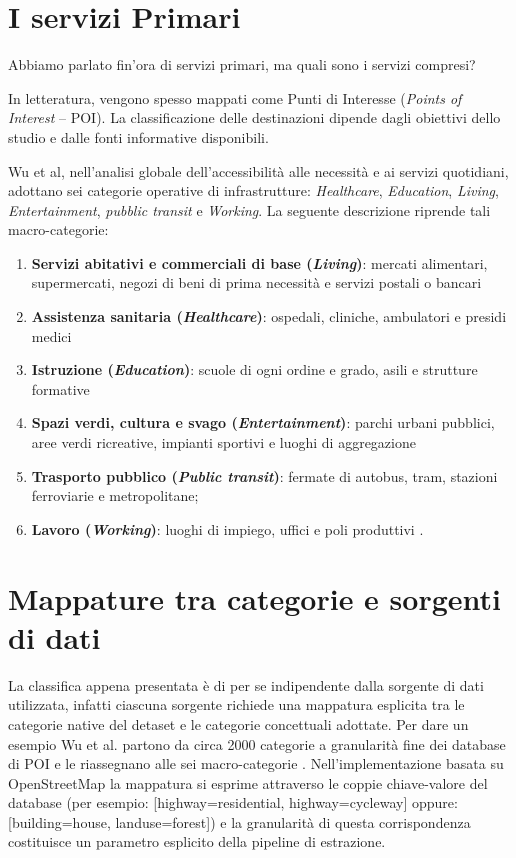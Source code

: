\section{I servizi Primari}
Abbiamo parlato fin'ora di servizi primari, ma quali sono i servizi compresi?

In letteratura, vengono spesso mappati come Punti di Interesse (\textit{Points of Interest} -- POI). La classificazione delle destinazioni dipende dagli obiettivi dello studio e dalle fonti informative disponibili.

Wu et al, nell'analisi globale dell'accessibilità alle necessità e ai servizi quotidiani, adottano sei categorie operative di infrastrutture: \emph{Healthcare}, \emph{Education}, \emph{Living}, \emph{Entertainment}, \emph{pubblic transit} e \emph{Working}. La seguente descrizione riprende tali macro-categorie: \cite{wu2025}
\begin{enumerate}
    \item \textbf{Servizi abitativi e commerciali di base (\textit{Living})}: mercati alimentari, supermercati, negozi di beni di prima necessità e servizi postali o bancari 
    \item \textbf{Assistenza sanitaria (\textit{Healthcare})}: ospedali, cliniche, ambulatori e presidi medici 
    \item \textbf{Istruzione (\textit{Education})}: scuole di ogni ordine e grado, asili e strutture formative 
    \item \textbf{Spazi verdi, cultura e svago (\textit{Entertainment})}: parchi urbani pubblici, aree verdi ricreative, impianti sportivi e luoghi di aggregazione 
    \item \textbf{Trasporto pubblico (\textit{Public transit})}: fermate di autobus, tram, stazioni ferroviarie e metropolitane;
    \item \textbf{Lavoro (\textit{Working})}: luoghi di impiego, uffici e poli produttivi .
\end{enumerate}

\section{Mappature tra categorie e sorgenti di dati}

La classifica appena presentata è di per se indipendente dalla sorgente di dati utilizzata, infatti ciascuna sorgente richiede una mappatura esplicita tra le categorie native del detaset e le categorie concettuali adottate.
Per dare un esempio Wu et al. partono da circa 2000 categorie a granularità fine dei database di POI e le riassegnano alle sei macro-categorie \cite{wu2025}.
Nell'implementazione basata su OpenStreetMap la mappatura si esprime attraverso le coppie chiave-valore del database (per esempio: [highway=residential, highway=cycleway] oppure: [building=house, landuse=forest]) e la granularità di questa corrispondenza costituisce un parametro esplicito della pipeline di estrazione.

